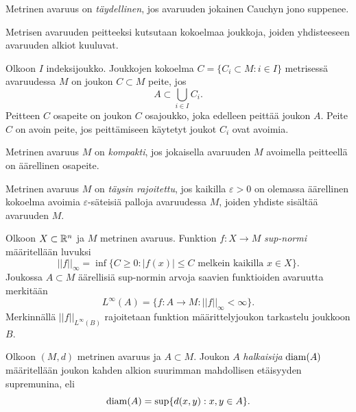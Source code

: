 \documentclass[12pt,oneside,a4paper]{amsbook} %
\begin{document}
\begin{definition}
    Metrinen avaruus on \textit{täydellinen}, jos avaruuden jokainen Cauchyn jono suppenee. 
\end{definition} 

Metrisen avaruuden peitteeksi kutsutaan kokoelmaa joukkoja, joiden yhdisteeseen avaruuden alkiot kuuluvat.

\begin{definition}
    Olkoon $I$ indeksijoukko. Joukkojen kokoelma $C = \{C_i \subset M \colon i \in I\}$ metrisessä avaruudessa $M$ on joukon $C \subset M$ peite, jos 
    \begin{equation*}
        A \subset \bigcup_{i\in I}C_i.
    \end{equation*}
    Peitteen $C$ osapeite on joukon $C$ osajoukko, joka edelleen peittää joukon $A$. Peite $C$ on avoin peite, jos peittämiseen käytetyt joukot $C_i$ ovat avoimia. 
\end{definition}



\begin{definition}
    Metrinen avaruus $M$ on \textit{kompakti}, jos jokaisella avaruuden $M$ avoimella peitteellä on äärellinen osapeite. 
\end{definition}

\begin{definition}
    Metrinen avaruus $M$ on \textit{täysin rajoitettu}, jos kaikilla $\varepsilon > 0$ on olemassa äärellinen kokoelma avoimia $\varepsilon$-säteisiä palloja avaruudessa $M$, joiden yhdiste sisältää avaruuden $M$.
\end{definition}

\begin{definition}
Olkoon $X\subset \mathbb{R}^n$ ja $M$ metrinen avaruus. Funktion $f: X \to M$ \textit{sup-normi} määritellään luvuksi
\begin{equation*}
    ||f||_\infty = \inf\{C \ge 0 : |f(x)| \le C \text{ melkein kaikilla } x \in X\}.
\end{equation*}
Joukossa $A\subset M$ äärellisiä sup-normin arvoja saavien funktioiden avaruutta merkitään
    \[L^\infty (A) = \{f:A\to M \colon  ||f||_\infty < \infty\}.\] 
Merkinnällä $||f||_{L^\infty(B)}$ rajoitetaan funktion määrittelyjoukon tarkastelu joukkoon $B$.
\end{definition}

\begin{definition}
    Olkoon $(M, d)$ metrinen avaruus ja $A \subset M$. Joukon $A$ \textit{halkaisija} $\operatorname{diam}(A)$ määritellään joukon kahden alkion suurimman mahdollisen etäisyyden supremunina, eli
    \begin{equation*}
        \operatorname{diam}(A) = \sup\{d(x, y) : x,y \in A\}.
    \end{equation*}
\end{definition}
\end{document}
